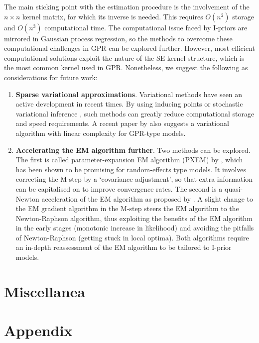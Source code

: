 \documentclass[a4paper,showframe,11pt]{report}
\begin{document}
The main sticking point with the estimation procedure is the involvement of the $n\times n$ kernel matrix, for which its inverse is needed.
This requires $O(n^2)$ storage and $O(n^3)$ computational time.
The computational issue faced by I-priors are mirrored in Gaussian process regression, so the methods to overcome these computational challenges in GPR can be explored further.
However, most efficient computational solutions exploit the nature of the SE kernel structure, which is the most common kernel used in GPR.
Nonetheless, we suggest the following as considerations for future work:
\begin{enumerate}
  \item \textbf{Sparse variational approximations}. Variational methods have seen an active development in recent times. By using inducing points \citep{titsias2009variational} or stochastic variational inference \citep{hensman2013gaussian}, such methods can greatly reduce computational storage and speed requirements. A recent paper by \citet{cheng2017variational} also suggests a variational algorithm with linear complexity for GPR-type models.
  \item \textbf{Accelerating the EM algorithm further}. Two methods can be explored. The first is called parameter-expansion EM algorithm (PXEM) by \citep{liu1998parameter}, which has been shown to be promising for random-effects type models. It involves correcting the M-step by a `covariance adjustment', so that extra information can be capitalised on to improve convergence rates. The second is a quasi-Newton acceleration of the EM algorithm as proposed by \citet{lange1995quasi}. A slight change to the EM gradient algorithm in the M-step steers the EM algorithm to the Newton-Raphson algorithm, thus exploiting the benefits of the EM algorithm in the early stages (monotonic increase in likelihood) and avoiding the pitfalls of Newton-Raphson (getting stuck in local optima). Both algorithms require an in-depth reassessment of the EM algorithm to be tailored to I-prior models.
\end{enumerate}

\section{Miscellanea}


\ifstandalone
  \section*{Appendix}
  
  
  
  
\fi

\hClosingStuffStandalone
\end{document}

